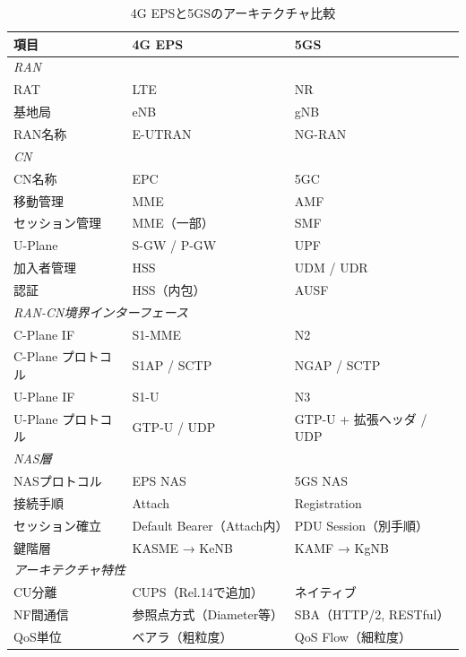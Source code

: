 \begin{table}[htbp]
\centering
\caption{4G EPSと5GSのアーキテクチャ比較}
\label{tab:4g5g_architecture_comparison}
\small
\begin{tabular}{|l|l|l|}
\hline
\textbf{項目} & \textbf{4G EPS} & \textbf{5GS} \\
\hline \hline
\multicolumn{3}{|l|}{\textit{RAN}} \\
\hline
RAT & LTE & NR \\
\hline
基地局 & eNB & gNB \\
\hline
RAN名称 & E-UTRAN & NG-RAN \\
\hline \hline
\multicolumn{3}{|l|}{\textit{CN}} \\
\hline
CN名称 & EPC & 5GC \\
\hline
移動管理 & MME & AMF \\
\hline
セッション管理 & MME（一部） & SMF \\
\hline
U-Plane & S-GW / P-GW & UPF \\
\hline
加入者管理 & HSS & UDM / UDR \\
\hline
認証 & HSS（内包） & AUSF \\
\hline \hline
\multicolumn{3}{|l|}{\textit{RAN-CN境界インターフェース}} \\
\hline
C-Plane IF & S1-MME & N2 \\
\hline
C-Plane プロトコル & S1AP / SCTP & NGAP / SCTP \\
\hline
U-Plane IF & S1-U & N3 \\
\hline
U-Plane プロトコル & GTP-U / UDP & GTP-U + 拡張ヘッダ / UDP \\
\hline \hline
\multicolumn{3}{|l|}{\textit{NAS層}} \\
\hline
NASプロトコル & EPS NAS & 5GS NAS \\
\hline
接続手順 & Attach & Registration \\
\hline
セッション確立 & Default Bearer（Attach内） & PDU Session（別手順） \\
\hline
鍵階層 & KASME → KeNB & KAMF → KgNB \\
\hline \hline
\multicolumn{3}{|l|}{\textit{アーキテクチャ特性}} \\
\hline
CU分離 & CUPS（Rel.14で追加） & ネイティブ \\
\hline
NF間通信 & 参照点方式（Diameter等） & SBA（HTTP/2, RESTful） \\
\hline
QoS単位 & ベアラ（粗粒度） & QoS Flow（細粒度） \\
\hline
\end{tabular}
\end{table}

